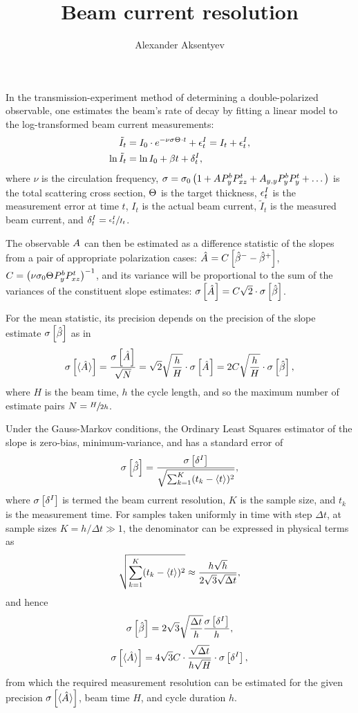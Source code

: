 \documentclass{article}
\newcommand{\Tint}{\Delta t}
\begin{document}
	
\title{Beam current resolution}
\author{Alexander Aksentyev}
\maketitle
	
In the transmission-experiment method of determining a double-polarized observable, one estimates the beam's rate of decay by fitting a linear model to the log-transformed beam current measurements:
\begin{align*}
	\tilde{I}_t  &= I_0 \cdot e^{-\nu\CS\Thick\cdot t} + \err^I_t = I_t + \err^I_t, \\
	\ln \tilde{I}_t &= \ln I_0 + \slp t + \delta^I_t,
\end{align*}
	where $\nu$ is the circulation frequency, $\CS = \CS[0]\bkt{1 + \A P^b_y P^t_{xz} + A_{y,y} P^b_y P^t_y + \dots}$ is the total scattering cross section, $\Thick$ is the target thickness, $\epsilon^I_t$ is the measurement error at time $t$, $I_t$ is the actual beam current, $\tilde{I}_t$ is the measured beam current, and $\delta^I_t = \sfrac{\epsilon^I_t}{I_t}$.


The observable $\A$ can then be estimated as a difference statistic of the slopes from a pair of appropriate polarization cases: $\A* = C\bkt*{\slp*^- - \slp*^+}$, $C = \bkt{\nu\CS[0]\Thick P^b_y P^t_{xz}}^{-1}$, and its variance will be proportional to the sum of the variances of the constituent slope estimates: $\SE{\A*} = C\sqrt{2}\cdot\SE{\slp*}$.

For the mean statistic, its precision depends on the precision of the slope estimate $\SE{\slp*}$ as in
\begin{equation}\label{eq:AvgASE}
\SE{\avg{\A*}} = \frac{\SE{\A*}}{\sqrt N} = \sqrt{2}\sqrt{\frac hH}\cdot\SE{\A*} = 2C\sqrt{\frac hH}\cdot\SE{\slp*},
\end{equation}
where $H$ is the beam time, $h$ the cycle length, and so the maximum number of estimate pairs $N = \sfrac{H}{2h}$.

Under the Gauss-Markov conditions, the Ordinary Least Squares estimator of the slope is zero-bias, minimum-variance, and has a standard error of
\begin{equation}\label{eq:SlpVarGM}
\SE{\slp*} = \frac{\SE{\delta^I}}{\sqrt{\sum_{k=1}^K (t_k - \avg{t})^2}},
\end{equation}
where $\SE{\delta^I}$ is termed the beam current resolution, $K$ is the sample size, and $t_k$ is the measurement time. For samples taken uniformly in time with step $\Tint$, at sample sizes $K = h/\Tint \gg 1$, the denominator can be expressed in physical terms as
\[
\sqrt{\sum_{k=1}^K (t_k - \avg{t})^2} \approx \frac{h\sqrt{h}}{2\sqrt{3}\sqrt{\Tint}},
\]
and hence 
\begin{equation}\label{eq:SlpVar}
	\SE{\slp*} = 2\sqrt{3}\sqrt{\frac{\Delta t}{h}}\frac{\SE{\delta^I}}{h},
\end{equation}
\begin{equation}
	\SE{\avg{\A*}} = 4\sqrt{3}C\cdot \frac{\sqrt{\Tint}}{h\sqrt{H}}\cdot\SE{\delta^I},
\end{equation}
from which the required measurement resolution can be estimated for the given precision $\SE{\avg{\A*}}$, beam time $H$, and cycle duration $h$.
\end{document}

